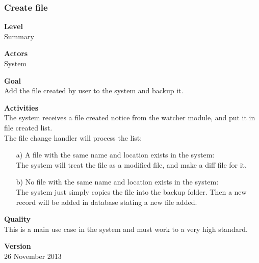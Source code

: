 \documentclass[12pt,a4paper]{article}
\begin{document}
\subsubsection{Create file} 
\begin{description}
	\item \textbf{Level}  \\
	Summary
	\item \textbf{Actors} \\
	System
	\item \textbf{Goal} \\
	Add the file created by user to the system and backup it.
	\item \textbf{Activities} \\
	The system receives a file created notice from the watcher module, and put it in file created list.\\
	The file change handler will process the list:
	\begin{enumerate}
		\item[a)]A file with the same name and location exists in the system: \\
		The system will treat the file as a modified file, and make a diff  file for it.
		\item[b)]No file with the same name and location exists in the system: \\
		The system just simply copies the file into the backup folder. Then a new record will be added in database stating a new file added.
	\end{enumerate}
	\item \textbf{Quality} \\
	This is a main use case in the system and must work to a very high standard.
	\item \textbf{Version} \\
	26 November 2013	
\end{description}
\end{document}
